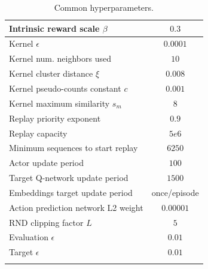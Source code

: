 \documentclass{article} %
\begin{document}
\begin{small}
\begin{longtable}[h!]{l|c}
Intrinsic reward scale $\beta$ & $0.3$ \\ \hline
Kernel $\epsilon$ & $0.0001$ \\ \hline
Kernel num. neighbors used & $10$ \\ \hline 
Kernel cluster distance $\xi$ & $0.008$ \\ \hline
Kernel pseudo-counts constant $c$ & $0.001$ \\ \hline
Kernel maximum similarity $s_m$ & $8$ \\ \hline
Replay priority exponent & $0.9$ \\ \hline 
Replay capacity & $5e6$ \\ \hline 
Minimum sequences to start replay & $6250$ \\ \hline 
Actor update period & $100$ \\ \hline
Target Q-network update period & $1500$ \\ \hline
Embeddings target update period & once/episode \\ \hline
Action prediction network L2 weight & $0.00001$ \\ \hline
RND clipping factor $L$ & $5$ \\ \hline
Evaluation $\epsilon$ & $0.01$ \\ \hline
Target $\epsilon$ & $0.01$ \\ \hline

\caption{Common hyperparameters.}
\label{table_hyper_montezuma_common}
\vspace{-2ex}
\end{longtable}
\end{small}
\end{document}
